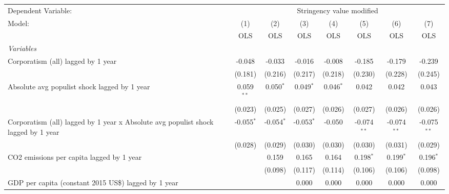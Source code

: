 
\begingroup
\centering
\begin{tabular}{lccccccc}
   \toprule
   Dependent Variable: & \multicolumn{7}{c}{Stringency value modified}\\
   Model:                                                                            & (1)          & (2)          & (3)          & (4)         & (5)           & (6)           & (7)\\  
                                                                                     &  OLS         & OLS          & OLS          & OLS         & OLS           & OLS           & OLS\\  
   \midrule
   \emph{Variables}\\
   Corporatism (all) lagged by 1 year                                                & -0.048       & -0.033       & -0.016       & -0.008      & -0.185        & -0.179        & -0.239\\   
                                                                                     & (0.181)      & (0.216)      & (0.217)      & (0.218)     & (0.230)       & (0.228)       & (0.245)\\   
   Absolute avg populist shock lagged by 1 year                                      & 0.059$^{**}$ & 0.050$^{*}$  & 0.049$^{*}$  & 0.046$^{*}$ & 0.042         & 0.042         & 0.043\\   
                                                                                     & (0.023)      & (0.025)      & (0.027)      & (0.026)     & (0.027)       & (0.026)       & (0.026)\\   
   Corporatism (all) lagged by 1 year x Absolute avg populist shock lagged by 1 year & -0.055$^{*}$ & -0.054$^{*}$ & -0.053$^{*}$ & -0.050      & -0.074$^{**}$ & -0.074$^{**}$ & -0.075$^{**}$\\   
                                                                                     & (0.028)      & (0.029)      & (0.030)      & (0.030)     & (0.030)       & (0.031)       & (0.029)\\   
   CO2 emissions per capita lagged by 1 year                                         &              & 0.159        & 0.165        & 0.164       & 0.198$^{*}$   & 0.199$^{*}$   & 0.196$^{*}$\\   
                                                                                     &              & (0.098)      & (0.117)      & (0.114)     & (0.106)       & (0.106)       & (0.098)\\   
   GDP per capita (constant 2015 US\$) lagged by 1 year                              &              &              & 0.000        & 0.000       & 0.000         & 0.000         & 0.000\\   

\end{tabular}
